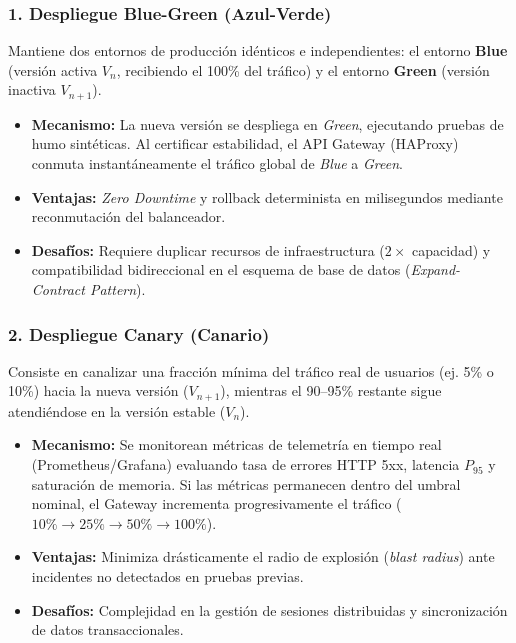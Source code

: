 \documentclass[11pt,a4paper]{article}
\begin{document}
\subsubsection{1. Despliegue Blue-Green (Azul-Verde)}
Mantiene dos entornos de producci\'on id\'enticos e independientes: el entorno \textbf{Blue} (versi\'on activa $V_n$, recibiendo el 100\% del tr\'afico) y el entorno \textbf{Green} (versi\'on inactiva $V_{n+1}$).
\begin{itemize}[noitemsep]
  \item \textbf{Mecanismo:} La nueva versi\'on se despliega en \emph{Green}, ejecutando pruebas de humo sint\'eticas. Al certificar estabilidad, el API Gateway (HAProxy) conmuta instant\'aneamente el tr\'afico global de \emph{Blue} a \emph{Green}.
  \item \textbf{Ventajas:} \emph{Zero Downtime} y rollback determinista en milisegundos mediante reconmutaci\'on del balanceador.
  \item \textbf{Desaf\'ios:} Requiere duplicar recursos de infraestructura ($2\times$ capacidad) y compatibilidad bidireccional en el esquema de base de datos (\emph{Expand-Contract Pattern}).
\end{itemize}

\subsubsection{2. Despliegue Canary (Canario)}
Consiste en canalizar una fracci\'on m\'inima del tr\'afico real de usuarios (ej. 5\% o 10\%) hacia la nueva versi\'on ($V_{n+1}$), mientras el 90--95\% restante sigue atendi\'endose en la versi\'on estable ($V_n$).
\begin{itemize}[noitemsep]
  \item \textbf{Mecanismo:} Se monitorean m\'etricas de telemetr\'ia en tiempo real (Prometheus/Grafana) evaluando tasa de errores HTTP 5xx, latencia $P_{95}$ y saturaci\'on de memoria. Si las m\'etricas permanecen dentro del umbral nominal, el Gateway incrementa progresivamente el tr\'afico ($10\% \to 25\% \to 50\% \to 100\%$).
  \item \textbf{Ventajas:} Minimiza dr\'asticamente el radio de explosi\'on (\emph{blast radius}) ante incidentes no detectados en pruebas previas.
  \item \textbf{Desaf\'ios:} Complejidad en la gesti\'on de sesiones distribuidas y sincronizaci\'on de datos transaccionales.
\end{itemize}
\end{document}
